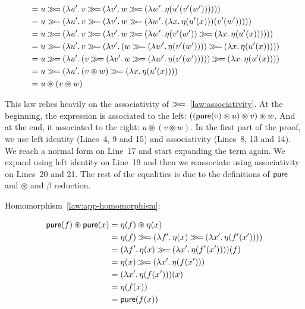 \begin{align}
  &= u \hsbind (\lam{u'}{v \hsbind (\lam{v'}{w \hsbind (\lam{w'}{\eta(u'(v'(w')))})})}) \\
  &= u \hsbind (\lam{u'}{v \hsbind (\lam{v'}{w \hsbind (\lam{w'}{(\lam{x}{\eta(u'(x))})(v'(w'))})})}) \\
  &= u \hsbind (\lam{u'}{v \hsbind (\lam{v'}{w \hsbind (\lam{w'}{\eta(v'(w')) \hsbind (\lam{x}{\eta(u'(x))})})})}) \\
  &= u \hsbind (\lam{u'}{v \hsbind (\lam{v'}{(w \hsbind (\lam{w'}{\eta(v'(w'))})) \hsbind (\lam{x}{\eta(u'(x))})})}) \\
  &= u \hsbind (\lam{u'}{(v \hsbind (\lam{v'}{w \hsbind (\lam{w'}{\eta(v'(w'))})})) \hsbind (\lam{x}{\eta(u'(x))})}) \\
  &= u \hsbind (\lam{u'}{(v \circledast w) \hsbind (\lam{x}{\eta(u'(x))})}) \\
  &= u \circledast (v \circledast w)
\end{align}
\setcounter{equation}{\value{TemporaryCounter}}
\ChapterPrefix

This law relies heavily on the associativity of
$\mathbin{\gg\!=}$~\eqref{law:associativity}. At the beginning, the expression is
associated to the left:
$((\mathsf{pure}({\mathbin{\circ}}) \circledast u) \circledast v) \circledast w$. And at the
end, it associated to the right: $u \circledast (v \circledast w)$. In the
first part of the proof, we use left identity (Lines~4, 9 and 15) and
associativity (Lines~8, 13 and 14). We reach a normal form on Line~17 and start
expanding the term again. We expand using left identity on Line~19 and then
we reassociate using associativity on Lines~20 and 21. The rest of the
equalities is due to the definitions of $\mathsf{pure}$ and $\circledast$ and
$\beta$ reduction.

Homomorphism~\eqref{law:app-homomorphism}:

\setcounter{TemporaryCounter}{\value{equation}}
\setcounter{equation}{0}
\NoChapterPrefix
\begin{align}
\mathsf{pure}(f) \circledast \mathsf{pure}(x)
&= \eta(f) \circledast \eta(x) \\
&= \eta(f) \mathbin{\gg\!=} (\lambda f'.\, \eta(x) \mathbin{\gg\!=} (\lambda x'.\, \eta(f'(x')))) \\
&= (\lambda f'.\, \eta(x) \mathbin{\gg\!=} (\lambda x'.\, \eta(f'(x'))))(f) \\
&= \eta(x) \mathbin{\gg\!=} (\lambda x'.\, \eta(f(x'))) \\
&= (\lambda x'.\, \eta(f(x')))(x) \\
&= \eta(f(x)) \\
&= \mathsf{pure}(f(x))
\end{align}
\setcounter{equation}{\value{TemporaryCounter}}
\ChapterPrefix

